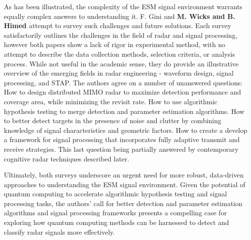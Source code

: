 As has been illustrated, the complexity of the \ac{ESM} signal environment warrants equally complex answers to understanding it.
F. Gini \cite{gini_grand_2021} and \textbf{M. Wicks and B. Himed \cite{wicks_four_2004}} attempt to survey such challenges and future solutions. 
Each survey satisfactorily outlines the challenges in the field of radar and signal processing, however both papers show a lack of rigor in experimental method, with no attempt to describe the data collection methods, selection criteria, or analysis process.
While not useful in the academic sense, they do provide an illustrative overview of the emerging fields in radar engineering - waveform design, signal processing, and \ac{STAP}.
The authors agree on a number of unanswered questions:
How to design distributed \ac{MIMO} radar to maximize detection performance and coverage area, while minimizing the revisit rate.
How to use algorithmic hypothesis testing to merge detection and parameter estimation algorithms.
How to better detect targets in the presence of noise and clutter by combining knowledge of signal characteristics and geometric factors.
How to create a develop a framework for signal processing that incorporates fully adaptive transmit and receive strategies.
This last question being partially answered by contemporary cognitive radar techniques described later.

Ultimately, both surveys underscore an urgent need for more robust, data-driven approaches to understanding the \ac{ESM} signal environment.
Given the potential of quantum computing to accelerate algorithmic hypothesis testing and signal processing tasks, the authors' call for better detection and parameter estimation algorithms and signal processing frameworks presents a compelling case for exploring how quantum computing methods can be harnessed to detect and classify radar signals more effectively.

